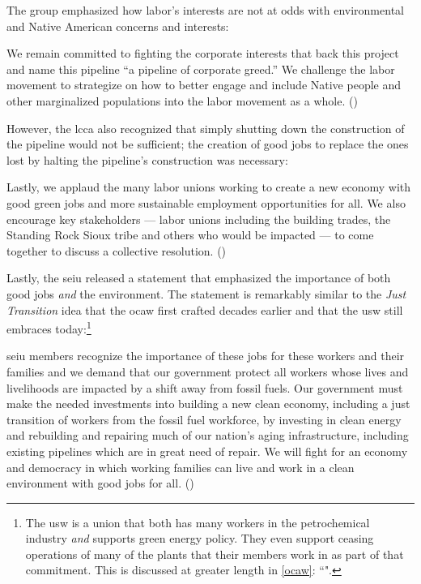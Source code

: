 \documentclass[12pt]{article}
\renewenvironment{quote}
  {\list{}{\leftmargin=\parindent\rightmargin=0pt}%
   \item\relax}
  {\endlist}
\newcommand{\fullref}[1]{\autoref{#1}: ``\nameref{#1}"}
\begin{document}
The group emphasized how labor’s interests are not at odds with environmental and Native American concerns and interests:

\begin{quote}
We remain committed to fighting the corporate interests that back this project and name this pipeline “a pipeline of corporate greed.” We challenge the labor movement to strategize on how to better engage and include Native people and other marginalized populations into the labor movement as a whole. (\cite{apalaAFLCIOConstituencyGroups2016})
\end{quote}

\noindent{}However, the \acrshort{lcca} also recognized that simply shutting down the construction of the pipeline would not be sufficient; the creation of good jobs to replace the ones lost by halting the pipeline’s construction was necessary:

\begin{quote}
Lastly, we applaud the many labor unions working to create a new economy with good green jobs and more sustainable employment opportunities for all. We also encourage key stakeholders — labor unions including the building trades, the Standing Rock Sioux tribe and others who would be impacted — to come together to discuss a collective resolution. (\cite{apalaAFLCIOConstituencyGroups2016})
\end{quote}

\noindent{}Lastly, the \acrshort{seiu} released a statement that emphasized the importance of both good jobs \emph{and} the environment. The statement is remarkably similar to the \textit{Just Transition} idea that the \acrfull{ocaw} first crafted decades earlier and that the \acrfull{usw} still embraces today:\footnote{The \acrshort{usw} is a union that both has many workers in the petrochemical industry \emph{and} supports green energy policy. They even support ceasing operations of many of the plants that their members work in as part of that commitment. This is discussed at greater length in \fullref{ocaw}.}

\begin{quote}
\acrshort{seiu} members recognize the importance of these jobs for these workers and their families and we demand that our government protect all workers whose lives and livelihoods are impacted by a shift away from fossil fuels. Our government must make the needed investments into building a new clean economy, including a just transition of workers from the fossil fuel workforce, by investing in clean energy and rebuilding and repairing much of our nation’s aging infrastructure, including existing pipelines which are in great need of repair. We will fight for an economy and democracy in which working families can live and work in a clean environment with good jobs for all. (\cite{nlfUnionsWeighDakota2016})
\end{quote}
\end{document}
